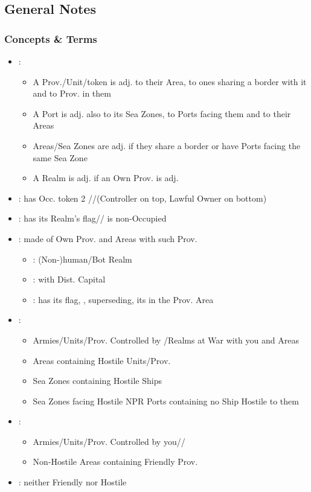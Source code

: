 \documentclass[10pt]{article}
\begin{document}
\addbackground
\addfooter


\subsection*{General Notes }
\subsubsection*{Concepts \& Terms}
\begin{itemize}
	\item {}:
	\begin{itemize}
		\item A Prov./Unit/token is adj. to their Area, to ones sharing a border with it and to Prov. in them
		\item A Port is adj. also to its Sea Zones, to Ports facing them and to their Areas
		\item Areas/Sea Zones are adj. if they share a border or have Ports facing the same Sea Zone
		\item A Realm is adj. if an Own Prov. is adj.
	\end{itemize}
	\item {}: has Occ. token  2 \rebel/\town/\vassal (Controller on top, Lawful Owner on bottom)
	\item {}: has its Realm's flag/\town/\dnpr {} is non-Occupied
	\item {}: made of Own Prov. and Areas with such Prov.
	\begin{itemize}
		\item {}: (Non-)human/Bot Realm
		\item {}: with Dist. Capital
		\item {}: has its flag, , superseding, its \core in the Prov. Area
	\end{itemize}
	\item {}:
	\begin{itemize}
		\item Armies/Units/Prov. Controlled by \rebels/Realms at War with you and Areas
		\item Areas containing Hostile Units/Prov.
		\item Sea Zones containing Hostile Ships
		\item Sea Zones facing Hostile NPR Ports  containing no Ship Hostile to them
	\end{itemize}
	\item {}:
	\begin{itemize}
		\item Armies/Units/Prov. Controlled by you/\ally/\vassal
		\item Non-Hostile Areas containing Friendly Prov.
	\end{itemize}
	\item {}: neither Friendly nor Hostile
\end{itemize}
\end{document}
